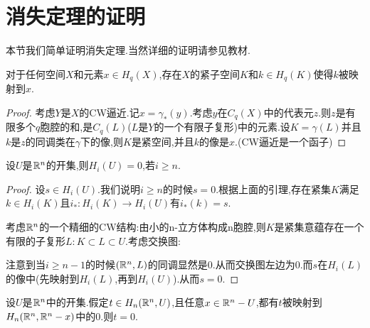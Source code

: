 \section{消失定理的证明}
本节我们简单证明消失定理.当然详细的证明请参见教材.

\begin{lemma}[同调的紧支性]
    对于任何空间$X$和元素$x \in H_q(X)$,存在$X$的紧子空间$K$和$k \in H_q(K)$使得$k$被映射到$x$.
\end{lemma}
\begin{proof}
    考虑$Y$是$X$的CW逼近.记$x=\gamma_*(y)$.考虑$y$在$C_q(X)$中的代表元$z$.则$z$是有限多个$q$胞腔的和,是$C_q(L)$($L$是$Y$的一个有限子复形)中的元素.设$K=\gamma(L)$并且$k$是$z$的同调类在$\gamma$下的像,则$K$是紧空间,并且$k$的像是$x$.(CW逼近是一个函子)
\end{proof}
\begin{lemma}
    设$U$是$\mathbb{R}^n$的开集,则$H_i(U)=0$,若$i \geq n$.
\end{lemma}
\begin{proof}
    设$s \in H_i(U)$.我们说明$i \geq n$的时候$s=0$.根据上面的引理,存在紧集$K$满足$k \in H_i(K)$且$i_*:H_i(K)\to H_i(U)$有$i_*(k)=s$.

    考虑$\mathbb{R}^n$的一个精细的CW结构:由小的n-立方体构成n胞腔,则$K$是紧集意蕴存在一个有限的子复形$L:K \subset L \subset U$.考虑交换图:

    注意到当$i \geq n-1$的时候$(\mathbb{R}^n,L)$的同调显然是$0$.从而交换图左边为$0$.而$s$在$H_i(L)$的像中(先映射到$H_i(L)$,再到$H_i(U)$).从而$s=0$.
\end{proof}
\begin{lemma}
    设$U$是$\mathbb{R}^n$中的开集.假定$t \in H_n(\mathbb{R}^n,U)$,且任意$x \in \mathbb{R}^n-U$,都有$t$被映射到$H_n(\mathbb{R}^n,\mathbb{R}^n-x)$中的$0$.则$t=0$.
\end{lemma}
